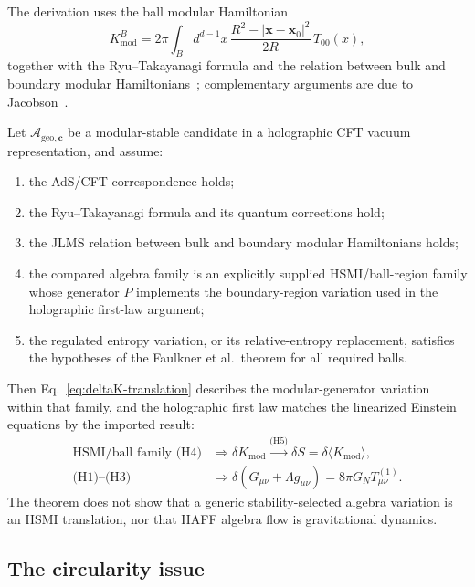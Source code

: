 The derivation uses the ball modular Hamiltonian~\cite{CasiniHuertaMyers2011}
\begin{equation}
K_{\mathrm{mod}}^B = 2\pi \int_B d^{d-1}x\, \frac{R^2 - |\mathbf{x} - \mathbf{x}_0|^2}{2R}\, T_{00}(x),
\end{equation}
together with the Ryu--Takayanagi formula and the relation between bulk and boundary modular Hamiltonians~\cite{JLMS2016}; complementary arguments are due to Jacobson~\cite{Jacobson2016}.

\begin{theorem}
\label{thm:linearized}
Let $\mathcal{A}_{\mathrm{geo},\mathbf{c}}$ be a modular-stable candidate in a holographic CFT vacuum representation, and assume:
\begin{enumerate}
\item[(H1)] the AdS/CFT correspondence holds;
\item[(H2)] the Ryu--Takayanagi formula and its quantum corrections hold;
\item[(H3)] the JLMS relation between bulk and boundary modular Hamiltonians holds;
\item[(H4)] the compared algebra family is an explicitly supplied HSMI/ball-region family whose generator $P$ implements the boundary-region variation used in the holographic first-law argument;
\item[(H5)] the regulated entropy variation, or its relative-entropy replacement, satisfies the hypotheses of the Faulkner et al.\ theorem for all required balls.
\end{enumerate}
Then Eq.~\eqref{eq:deltaK-translation} describes the modular-generator variation within that family, and the holographic first law matches the linearized Einstein equations by the imported result:
\begin{align}
 \text{HSMI/ball family (H4)}&\Longrightarrow\delta K_{\mathrm{mod}}
 \xrightarrow{\text{(H5)}}\delta S=\delta\langle K_{\mathrm{mod}}\rangle,
 \nonumber\\
 \text{(H1)--(H3)}&\Longrightarrow
 \delta(G_{\mu\nu}+\Lambda g_{\mu\nu})=8\pi G_NT_{\mu\nu}^{(1)}.
\end{align}
The theorem does not show that a generic stability-selected algebra variation is an HSMI translation, nor that HAFF algebra flow is gravitational dynamics.
\end{theorem}

\subsection{The circularity issue}

